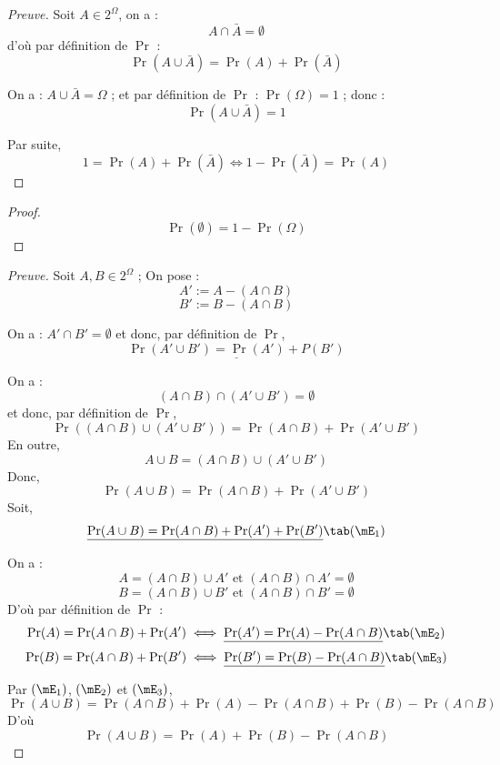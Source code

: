 %
\begin{proof}[Preuve]
Soit $A\in 2^\Omega$, 
on a :
$$A\cap \bar{A} = \emptyset$$
d'où par définition de $\Pr$ :
$$\Pr(A\cup \bar{A}) = \Pr(A) + \Pr(\bar{A})$$

On a : $A\cup \bar{A} = \Omega$ ; et par définition de $\Pr$ :
$\Pr(\Omega) = 1$ ; donc :
$$
\Pr(A\cup \bar{A}) = 1
$$

Par suite, 
$$1 = \Pr(A) + \Pr(\bar{A}) 
\iff 1-\Pr(\bar{A})  = \Pr(A) $$
\end{proof}


\begin{proof}
$$
\Pr(\emptyset) = 1 - \Pr(\Omega) 
$$
\end{proof}

%
\begin{proof}[Preuve]
Soit $A, B \in 2^\Omega$ ;
On pose :
$$A' := A - (A\cap B)$$
$$B' := B - (A\cap B)$$

On a :
$A'\cap B' = \emptyset$
et donc, par définition de $\Pr$,
$$\underline{\Pr(A' \cup B') = \Pr(A') + P(B')}$$

On a :
$$(A\cap B) \cap (A'\cup B') = \emptyset$$
et donc, par définition de $\Pr$,
$$\Pr ((A\cap B) \cup (A'\cup B')) = 
\Pr(A\cap B) + \Pr(A'\cup B')
$$
En outre, 
$$A\cup B = (A\cap B) \cup (A'\cup B')$$
Donc, 
$$\Pr(A \cup B) = 
\Pr(A\cap B) + \Pr(A'\cup B')
$$
Soit, 
$$
\underline{
\Pr(A \cup B) = 
\Pr(A\cap B) + \Pr(A') + \Pr(B')
} \tab(\mE_1)
$$

On a :
$$ A = (A\cap B) \cup A' \text{ et } (A\cap B) \cap A' = \emptyset$$
$$ B = (A\cap B) \cup B' \text{ et } (A\cap B) \cap B' = \emptyset$$
D'où par définition de $\Pr$ :
$$ \Pr(A) = \Pr(A\cap B) + \Pr(A') \iff 
\underline{\Pr(A') = \Pr(A) - \Pr(A\cap B)} \tab(\mE_2)$$
$$ \Pr(B) = \Pr(A\cap B) + \Pr(B') \iff 
\underline{\Pr(B') = \Pr(B) - \Pr(A\cap B)} \tab(\mE_3)$$

Par $(\mE_1)$, $(\mE_2)$ et $(\mE_3)$, 
$$
\Pr(A\cup B) = 
	\Pr(A\cap B) + 
	\Pr(A) - \Pr(A\cap B) +
	\Pr(B) - \Pr(A\cap B)
$$
D'où
$$
\Pr(A\cup B) = 
\Pr(A)+
\Pr(B) - \Pr(A\cap B)
$$
\end{proof}

